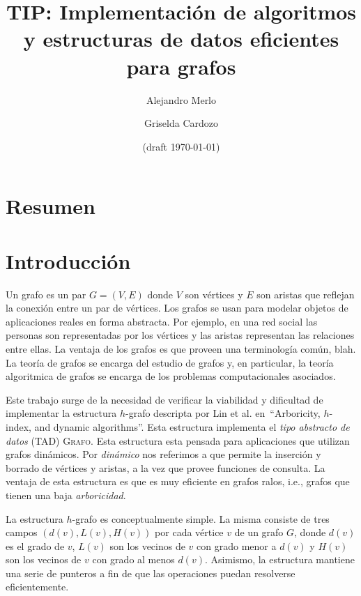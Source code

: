 \documentclass[a4paper,12pt]{article}
\newcommand{\Grafo}{\textsc{Grafo}\xspace}
\begin{document}
\title{TIP:  Implementación de algoritmos y estructuras de datos eficientes para grafos}

\author{Alejandro Merlo \and Griselda Cardozo}
\date{(draft \today)} %

\maketitle

\tableofcontents

\section{Resumen}
\label{sec:resumen}


\section{Introducción}
\label{sec:introduccion}

Un grafo es un par $G = (V, E)$ donde $V$ son vértices y $E$ son aristas que reflejan la conexión entre un par de vértices.  Los grafos se usan para modelar objetos de aplicaciones reales en forma abstracta.  Por ejemplo, en una red social las personas son representadas por los vértices y las aristas representan las relaciones entre ellas.  La ventaja de los grafos es que proveen una terminología común, blah.  La teoría de grafos se encarga del estudio de grafos y, en particular, la teoría algoritmica de grafos se encarga de los problemas computacionales asociados.


Este trabajo surge de la necesidad de verificar la viabilidad y dificultad de implementar la estructura $h$-grafo descripta por Lin et al. en~\cite{}``Arboricity, $h$-index, and dynamic algorithms''.   Esta estructura implementa el \emph{tipo abstracto de datos} (TAD) \Grafo.  Esta estructura esta pensada para aplicaciones que utilizan grafos dinámicos.  Por \emph{dinámico} nos referimos a que permite la inserción y borrado de vértices y aristas, a la vez que provee funciones de consulta.  La ventaja de esta estructura es que es muy eficiente en grafos ralos, i.e., grafos que tienen una baja \emph{arboricidad}.  

La estructura $h$-grafo es conceptualmente simple.  La misma consiste de tres campos $(d(v), L(v), H(v))$ por cada vértice $v$ de un grafo $G$, donde $d(v)$ es el grado de $v$, $L(v)$ son los vecinos de $v$ con grado menor a $d(v)$ y $H(v)$ son los vecinos de $v$ con grado al menos $d(v)$.  Asimismo, la estructura mantiene una serie de punteros a fin de que las operaciones puedan resolverse eficientemente.  
\end{document}

